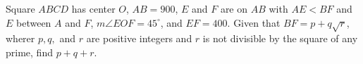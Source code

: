 Square $ABCD$ has center $O$, $AB=900$, $E$ and $F$ are on $AB$ with $AE<BF$ and $E$ between $A$ and $F$, $m\angle EOF =45^\circ$, and $EF=400$. Given that $BF=p+q\sqrt{r}$, wherer $p,q,$ and $r$ are positive integers and $r$ is not divisible by the square of any prime, find $p+q+r$.